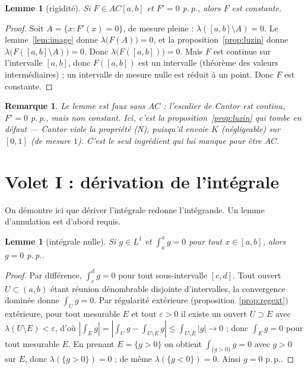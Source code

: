 \documentclass[11pt]{article}
\theoremstyle{thmblue}
\newtheorem{lemme}[theoreme]{Lemme}
\theoremstyle{defplain}
\theoremstyle{rem}
\newtheorem{remarque}[theoreme]{Remarque}
\newcommand{\pp}{p.\,p.}
\newcommand{\abs}[1]{\left\lvert #1 \right\rvert}
\newcommand{\eps}{\varepsilon}
\begin{document}
\begin{lemme}[rigidité]\label{lem:rigidite}
Si $F\in AC[a,b]$ et $F'=0$ \pp, alors $F$ est constante.
\end{lemme}

\begin{proof}
Soit $A=\{x:F'(x)=0\}$, de mesure pleine : $\lambda([a,b]\setminus A)=0$. Le lemme~\ref{lem:image}
donne $\lambda\bigl(F(A)\bigr)=0$, et la proposition~\ref{prop:luzin} donne
$\lambda\bigl(F([a,b]\setminus A)\bigr)=0$. Donc $\lambda\bigl(F([a,b])\bigr)=0$. Mais $F$ est continue
sur l'intervalle $[a,b]$, donc $F([a,b])$ est un intervalle (théorème des valeurs intermédiaires) ;
un intervalle de mesure nulle est réduit à un point. Donc $F$ est constante.
\end{proof}

\begin{remarque}
Le lemme est \emph{faux} sans $AC$ : l'escalier de Cantor est continu, $F'=0$ \pp, mais non constant.
Ici, c'est la proposition~\ref{prop:luzin} qui tombe en défaut --- Cantor viole la propriété (N),
puisqu'il envoie $K$ (négligeable) sur $[0,1]$ (de mesure $1$). C'est le seul ingrédient qui lui
manque pour être $AC$.
\end{remarque}

\section{Volet I : dérivation de l'intégrale}

On démontre ici que dériver l'intégrale redonne l'intégrande. Un lemme d'annulation est d'abord requis.

\begin{lemme}[intégrale nulle]\label{lem:nul}
Si $g\in L^1$ et $\int_a^x g=0$ pour tout $x\in[a,b]$, alors $g=0$ \pp.
\end{lemme}

\begin{proof}
Par différence, $\int_c^d g=0$ pour tout sous-intervalle $[c,d]$. Tout ouvert $U\subset(a,b)$ étant
réunion dénombrable disjointe d'intervalles, la convergence dominée donne $\int_U g=0$. Par régularité extérieure (proposition~\ref{prop:regext})
extérieure, pour tout mesurable $E$ et tout $\eps>0$ il existe un ouvert $U\supset E$ avec
$\lambda(U\setminus E)<\eps$, d'où $\abs{\int_E g}=\abs{\int_U g-\int_{U\setminus E}g}\le
\int_{U\setminus E}\abs g\to0$ ; donc $\int_E g=0$ pour tout mesurable $E$. En prenant $E=\{g>0\}$ on
obtient $\int_{\{g>0\}}g=0$ avec $g>0$ sur $E$, donc $\lambda(\{g>0\})=0$ ; de même
$\lambda(\{g<0\})=0$. Ainsi $g=0$ \pp.
\end{proof}
\end{document}
